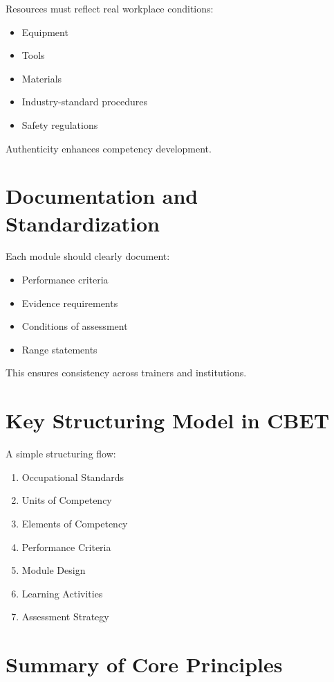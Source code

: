 \documentclass[12pt]{article}
\begin{document}
Resources must reflect real workplace conditions:

\begin{itemize}
    \item Equipment
    \item Tools
    \item Materials
    \item Industry-standard procedures
    \item Safety regulations
\end{itemize}

Authenticity enhances competency development.

\section{Documentation and Standardization}

Each module should clearly document:

\begin{itemize}
    \item Performance criteria
    \item Evidence requirements
    \item Conditions of assessment
    \item Range statements
\end{itemize}

This ensures consistency across trainers and institutions.

\section{Key Structuring Model in CBET}

A simple structuring flow:

\begin{enumerate}
    \item Occupational Standards
    \item Units of Competency
    \item Elements of Competency
    \item Performance Criteria
    \item Module Design
    \item Learning Activities
    \item Assessment Strategy
\end{enumerate}

\section{Summary of Core Principles}
\end{document}
